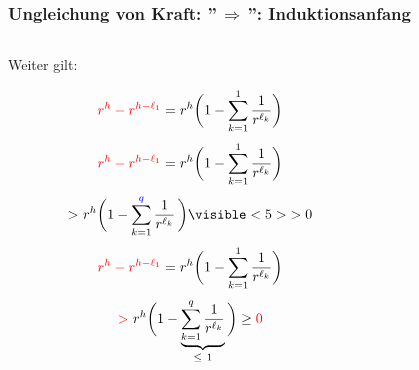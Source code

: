 \documentclass{beamer}
\begin{document}
\begin{frame}[t]
    \frametitle{Ungleichung von Kraft: ''$\,\Longrightarrow\,$'': Induktionsanfang}
    \begin{columns}
    \begin{column}{0.5\textwidth}
        Weiter gilt:
        \begin{overprint}
            $$
                {\color{red}r^h - r^{h - \ell_1}}
                = r^h\bigg(1 - \sum_{k=1}^{1} \frac{1}{r^{\ell_k}}\bigg)
            $$
            $$
                {\color{red}r^h - r^{h - \ell_1}}
                = r^h\bigg(1 - \sum_{k=1}^{1} \frac{1}{r^{\ell_k}}\bigg)
            $$
            $$
                {>}\ r^h\bigg(1 - \sum_{k=1}^{{\color{blue}q}} \frac{1}{r^{\ell_k}}\,\bigg )\visible<5>{> 0}
            $$
            $$
                {\color{red}r^h - r^{h - \ell_1}}
                = r^h\bigg(1 - \sum_{k=1}^{1} \frac{1}{r^{\ell_k}}\bigg)
            $$
            $$
                {\color{red} >}\ r^h\bigg(1 - \underbrace{\sum_{k=1}^{q} \frac{1}{r^{\ell_k}}}_{\leq\ 1}\bigg)
                \geq {\color{red}0}
            $$
        \end{overprint}
    \end{column}

        \begin{column}{0.55\textwidth}
        \onslide
            \begin{center}
\end{center}
\end{column}
\end{columns}
\end{frame}
\end{document}
